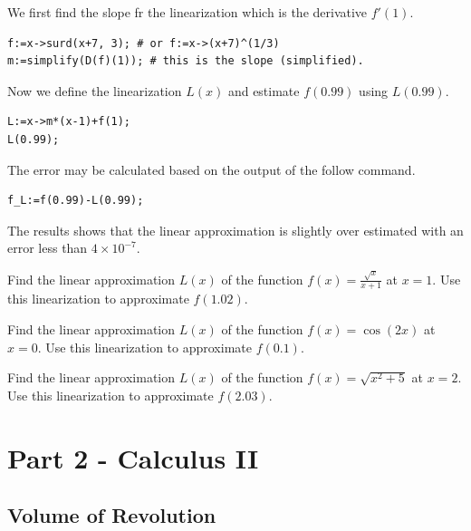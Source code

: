 \documentclass[]{book}
\theoremstyle{definition}
\theoremstyle{definition}
\theoremstyle{definition}
\theoremstyle{remark}
\let\BeginKnitrBlock\begin \let\EndKnitrBlock\end
\begin{document}
\BeginKnitrBlock{solution}
{}
We first find the slope fr the linearization which is the derivative \(f'(1)\).

\begin{verbatim}
f:=x->surd(x+7, 3); # or f:=x->(x+7)^(1/3)
m:=simplify(D(f)(1)); # this is the slope (simplified).
\end{verbatim}

Now we define the linearization \(L(x)\) and estimate \(f(0.99)\) using \(L(0.99)\).

\begin{verbatim}
L:=x->m*(x-1)+f(1);
L(0.99);
\end{verbatim}

The error may be calculated based on the output of the follow command.

\begin{verbatim}
f_L:=f(0.99)-L(0.99);
\end{verbatim}

The results shows that the linear approximation is slightly over estimated with an error less than \(4\times 10^{-7}\).
\EndKnitrBlock{solution}

\BeginKnitrBlock{exercise}
\protect\hypertarget{exr:unnamed-chunk-35}{}{\label{exr:unnamed-chunk-35} }
Find the linear approximation \(L(x)\) of the function \(f(x) = \frac{\sqrt{x}}{x+1}\) at \(x = 1\). Use this linearization to approximate \(f(1.02)\).
\EndKnitrBlock{exercise}

\BeginKnitrBlock{exercise}
\protect\hypertarget{exr:unnamed-chunk-36}{}{\label{exr:unnamed-chunk-36} }
Find the linear approximation \(L(x)\) of the function \(f(x) = \cos(2x)\) at \(x = 0\). Use this linearization to approximate \(f(0.1)\).
\EndKnitrBlock{exercise}

\BeginKnitrBlock{exercise}
\protect\hypertarget{exr:unnamed-chunk-37}{}{\label{exr:unnamed-chunk-37} }
Find the linear approximation \(L(x)\) of the function \(f(x) = \sqrt{x^2+5}\) at \(x = 2\). Use this linearization to approximate \(f(2.03)\).
\EndKnitrBlock{exercise}

\hypertarget{part-part-2---calculus-ii}{%
\part*{Part 2 - Calculus II}\label{part-part-2---calculus-ii}}

\hypertarget{volume-of-revolution}{%
\chapter{Volume of Revolution}\label{volume-of-revolution}}
\end{document}
